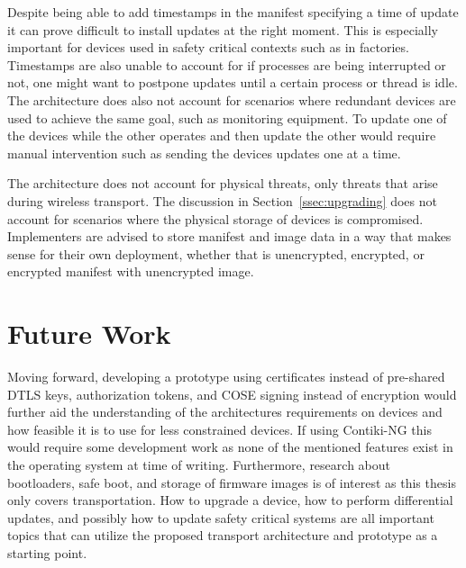\documentclass[0-thesis.tex]{subfiles}
\begin{document}
Despite being able to add timestamps in the manifest specifying a time of update it can
prove difficult to install updates at the right moment. This is especially important for
devices used in safety critical contexts such as in factories. Timestamps are also unable
to account for if processes are being interrupted or not, one might want to postpone
updates until a certain process or thread is idle. The architecture does also not account
for scenarios where redundant devices are used to achieve the same goal, such as
monitoring equipment. To update one of the devices while the other operates and then
update the other would require manual intervention such as sending the devices updates one
at a time.

The architecture does not account for physical threats, only threats that arise during
wireless transport. The discussion in Section~\ref{ssec:upgrading} does not account for
scenarios where the physical storage of devices is compromised. Implementers are advised
to store manifest and image data in a way that makes sense for their own deployment,
whether that is unencrypted, encrypted, or encrypted manifest with unencrypted image.


\section{Future Work}
\label{sec:future-work}
Moving forward, developing a prototype using certificates instead of pre-shared DTLS keys,
authorization tokens, and COSE signing instead of encryption would further aid the
understanding of the architectures requirements on devices and how feasible it is to use
for less constrained devices. If using Contiki-NG this would require some development work
as none of the mentioned features exist in the operating system at time of writing.
Furthermore, research about bootloaders, safe boot, and storage of firmware images is of
interest as this thesis only covers transportation. How to upgrade a device, how to
perform differential updates, and possibly how to update safety critical systems are all
important topics that can utilize the proposed transport architecture and prototype as a
starting point.
\end{document}
